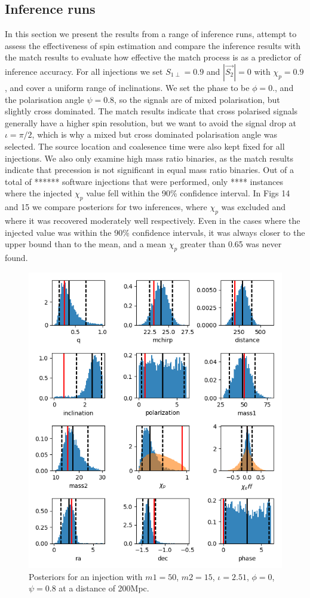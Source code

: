 \documentclass[11pt]{article}
\begin{document}
\subsection{Inference runs}
In this section we present the results from a range of inference runs, attempt to assess the effectiveness of spin estimation and compare the inference results with the match results to evaluate how effective the match process is as a predictor of inference accuracy. For all injections we set $S_{1\perp}=0.9$ and $|\vec{S_2}|=0$ with $\chi_p=0.9$, and cover a uniform range of inclinations. We set the phase to be $\phi=0.$, and the polarisation angle $\psi=0.8$, so the signals are of mixed polarisation, but slightly cross dominated. The match results indicate that cross polarised signals generally have a higher spin resolution, but we want to avoid the signal drop at $\iota=\pi/2$, which is why a mixed but cross dominated polarisation angle was selected. The source location and coalesence time were also kept fixed for all injections. We also only examine high mass ratio binaries, as the match results indicate that precession is not significant in equal mass ratio binaries. Out of a total of ****** software injections that were performed, only **** instances where the injected $\chi_p$ value fell within the 90\% confidence interval. In Figs 14 and 15 we compare posteriors for two inferences, where $\chi_p$ was excluded and where it was recovered moderately well respectively. Even in the cases where the injected value was within the 90\% confidence intervals, it was always closer to the upper bound than to the mean, and a mean $\chi_p$ greater than 0.65 was never found.
\begin{figure}[h]
	\includegraphics[scale=1]{fig14.png}
	\centering
	\caption{Posteriors for an injection with $m1=50$, $m2=15$, $\iota=2.51$, $\phi=0$, $\psi=0.8$ at a distance of 200Mpc.}
	\centering
\end{figure}
\end{document}
